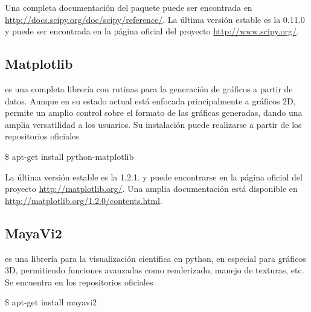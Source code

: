 Una completa documentación del paquete puede ser encontrada en 
\url{http://docs.scipy.org/doc/scipy/reference/}. La última versión estable
es la 0.11.0 y puede ser encontrada en la página oficial del proyecto 
\url{http://www.scipy.org/}.






\subsection*{Matplotlib}

\matplotlib es una completa librería con rutinas para la generación de 
gráficos a partir de datos. Aunque en su estado actual está enfocada 
principalmente a gráficos 2D, permite un amplio control sobre el formato 
de las gráficas generadas, dando una amplia versatilidad a los usuarios.
Su instalación puede realizarse a partir de los repositorios oficiales


\begin{listing}[style=consola, numbers=none]
\$ apt-get install python-matplotlib
\end{listing}


La última versión estable es la 1.2.1. y puede encontrarse en la página 
oficial del proyecto \url{http://matplotlib.org/}. Una amplia documentación
está disponible en \url{http://matplotlib.org/1.2.0/contents.html}.





\subsection*{MayaVi2}

\mayavi es una librería para la visualización científica en python, en 
especial para gráficos 3D, permitiendo funciones avanzadas como renderizado,
manejo de texturas, etc. Se encuentra en los repositorios oficiales 


\begin{listing}[style=consola, numbers=none]
\$ apt-get install mayavi2
\end{listing}


